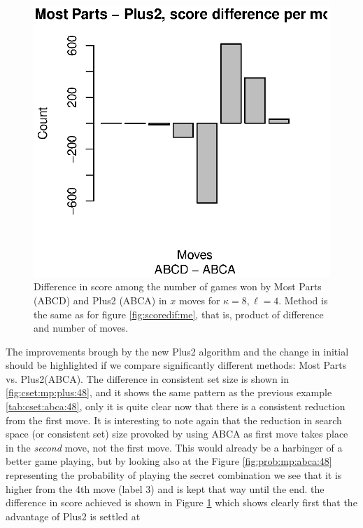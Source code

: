 \documentclass[preprint,12pt]{elsarticle}
\begin{document}
%
\begin{figure}[!htb]
\centering
\includegraphics{scoredif-most-plus2-abca-48.eps}
\caption{Difference in score among the number of games won by Most Parts
  (ABCD) and Plus2 (ABCA)  in $x$ moves for  $\kappa=8, \ell=4$. Method is the same as
  for figure \ref{fig:scoredif:me}, that is, product of difference and
  number of moves. \label{fig:scoredif:mp:abca:48}}
\end{figure}
%
The improvements brough by the new Plus2 algorithm and the change in
initial should be highlighted if we compare significantly different
methods: Most Parts vs. Plus2(ABCA). The difference in consistent set
size is shown in \ref{fig:cset:mp:plus:48}, and it shows the same
pattern as the previous example \ref{tab:cset:abca:48}, only it is
quite clear now that there is a consistent reduction from the first
move. It is interesting to note again that the reduction in search
space (or consistent set) size provoked by using ABCA as first move
takes place in the {\em second} move, not the first move. This would
already be a harbinger of a better game playing, but by looking also
at the Figure \ref{fig:prob:mp:abca:48} representing the probability
of playing the secret combination we see that it is higher from the
4th move (label 3) and is kept that way until the end. the difference
in score achieved is shown in Figure \ref{fig:scoredif:mp:abca:48}
which shows clearly first that the advantage of Plus2 is settled at
\end{document}
